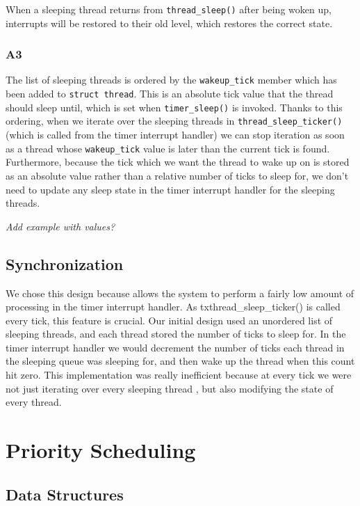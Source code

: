 \documentclass[a4wide, 11pt]{article}
\newcommand{\tx}{\texttt}
\begin{document}
When a sleeping thread returns from \texttt{thread\_sleep()} after being woken up, interrupts will be restored to their old level, which restores the correct state.

\subsubsection{A3}

The list of sleeping threads is ordered by the \tx{wakeup\_tick} member
which has been added to \tx{struct thread}. This is an absolute tick value that the thread 
should sleep until, which is set when \tx{timer\_sleep()} is invoked. Thanks to this ordering, when we iterate over the sleeping threads in \tx{thread\_sleep\_ticker()} (which is called from the
timer interrupt handler) we can stop iteration as soon as a thread whose
\tx{wakeup\_tick} value is later than the current tick is found.
\\
Furthermore, because the tick which we want the thread to wake up on is stored as
an absolute value rather than a relative number of ticks to sleep for, we don't
need to update any sleep state in the timer interrupt handler for the sleeping
threads.

\emph{Add example with values?}

\subsection{Synchronization}

We chose this design because allows the system to perform a fairly low amount of processing in the
timer interrupt handler. As tx{thread\_sleep\_ticker()} is called every tick, this feature is crucial. Our
initial design used an unordered list of sleeping threads, and each thread
stored the number of ticks to sleep for. In the timer interrupt handler we
would decrement the number of ticks each thread in the sleeping queue was
sleeping for, and then wake up the thread when this count hit zero. This implementation was
really inefficient because at every tick we were not just iterating over every sleeping
thread , but also modifying the state of every thread.

\section{Priority Scheduling}
\subsection{Data Structures}
\end{document}
